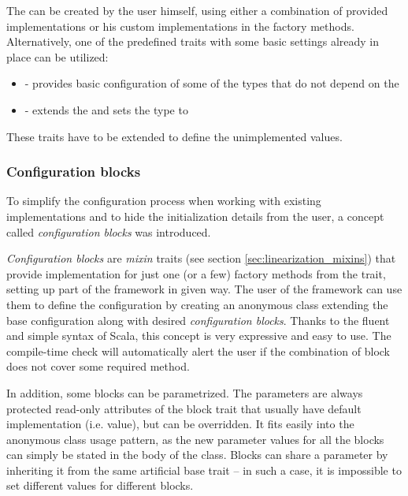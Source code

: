 The  can be created by the user himself, using either a combination of provided implementations or his custom implementations in the factory methods. Alternatively, one of the predefined  traits with some basic settings already in place can be utilized:

\begin{itemize}
	\item {} - provides basic configuration of some of the types that do not depend on the 
	\item {} - extends the  and sets the  type to 
\end{itemize}

These traits have to be extended to define the unimplemented values.

\subsubsection{Configuration blocks}
 To simplify the configuration process when working with existing implementations and to hide the initialization details from the user, a concept called \textit{configuration blocks} was introduced. 
 
 \textit{Configuration blocks} are \textit{mixin} traits (see section \ref{sec:linearization_mixins}) that provide implementation for just one (or a few) factory methods from the  trait, setting up part of the framework in given way. The user of the framework can use them to define the configuration by creating an anonymous class extending the base configuration along with desired \textit{configuration blocks}. Thanks to the fluent and simple syntax of Scala, this concept is very expressive and easy to use. The compile-time check will automatically alert the user if the combination of block does not cover some required method.
 
 In addition, some blocks can be parametrized. The parameters are always protected read-only attributes of the block trait that usually have default implementation (i.e. value), but can be overridden. It fits easily into the anonymous class usage pattern, as the new parameter values for all the blocks can simply be stated in the body of the class. Blocks can share a parameter by inheriting it from the same artificial base trait -- in such a case, it is impossible to set different values for different blocks.
 
